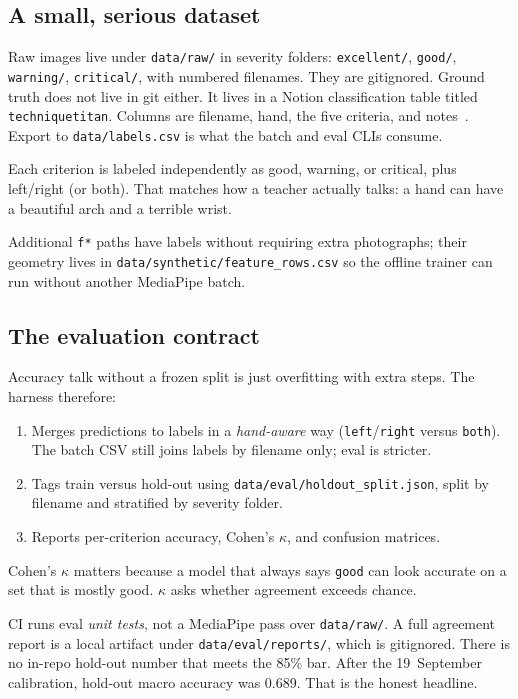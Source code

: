 \documentclass[11pt,a4paper]{article}
\newcommand{\code}[1]{\texttt{#1}}
\begin{document}
\subsection{A small, serious dataset}

Raw images live under \code{data/raw/} in severity folders: \code{excellent/}, \code{good/}, \code{warning/}, \code{critical/}, with numbered filenames.
They are gitignored.
Ground truth does not live in git either.
It lives in a Notion classification table titled \code{techniquetitan}.
Columns are filename, hand, the five criteria, and notes~\cite{datareadme}.
Export to \code{data/labels.csv} is what the batch and eval CLIs consume.

Each criterion is labeled independently as good, warning, or critical, plus left/right (or both).
That matches how a teacher actually talks: a hand can have a beautiful arch and a terrible wrist.

Additional \code{f*} paths have labels without requiring extra photographs; their geometry lives in \code{data/synthetic/feature\_rows.csv} so the offline trainer can run without another MediaPipe batch.

\subsection{The evaluation contract}

Accuracy talk without a frozen split is just overfitting with extra steps.
The harness therefore:

\begin{enumerate}
  \item Merges predictions to labels in a \emph{hand-aware} way (\code{left}/\code{right} versus \code{both}). The batch CSV still joins labels by filename only; eval is stricter.
  \item Tags train versus hold-out using \code{data/eval/holdout\_split.json}, split by filename and stratified by severity folder.
  \item Reports per-criterion accuracy, Cohen's \(\kappa\), and confusion matrices.
\end{enumerate}

Cohen's \(\kappa\) matters because a model that always says \texttt{good} can look accurate on a set that is mostly good.
\(\kappa\) asks whether agreement exceeds chance.

CI runs eval \emph{unit tests}, not a MediaPipe pass over \code{data/raw/}.
A full agreement report is a local artifact under \code{data/eval/reports/}, which is gitignored.
There is no in-repo hold-out number that meets the 85\% bar.
After the 19~September calibration, hold-out macro accuracy was 0.689.
That is the honest headline.
\end{document}
